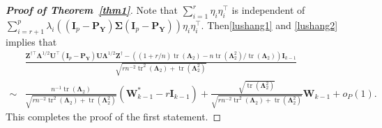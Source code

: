 \documentclass[10pt]{book}
\theoremstyle{definition}
\DeclareMathOperator{\mytr}{tr}
\newcommand{\bZ}{\mathbf{Z}}
\newcommand{\bP}{\mathbf{P}}
\newcommand{\bY}{\mathbf{Y}}
\newcommand{\bI}{\mathbf{I}}
\newcommand{\bU}{\mathbf{U}}
\newcommand{\bW}{\mathbf{W}}
\newcommand{\bfsym}[1]{\ensuremath{\boldsymbol{#1}}}
\def\bLambda {\bfsym {\Lambda}}
\def\bSigma {\bfsym {\Sigma}}
\begin{document}
\begin{proof}[\textbf{Proof of Theorem~\ref{thm1}}]
Note that $\sum_{i=1}^r \eta_i \eta_i^\top$ is independent of $
\sum_{i=r+1}^p \lambda_i ( (\bI_p-\bP_{\bY})\bSigma (\bI_p-\bP_{\bY}))\eta_i \eta_i^\top
$.
Then\eqref{lushang1} and \eqref{lushang2} implies that
\begin{equation}\label{lushang3}
    \begin{split}
&
\frac{
    \bZ^{\dagger \top} \bLambda^{1/2}\bU^\top (\bI_p-\bP_{\bY})\bU\bLambda^{1/2}\bZ^{\dagger}
    -
    \left((1+r/n)\mytr(\bLambda_2)-n\mytr(\bLambda_2^2)/\mytr(\bLambda_2)\right)\bI_{k-1}
}{
    \sqrt{
        rn^{-2}\mytr^2(\bLambda_2)+ 
        \mytr(\bLambda_2^2)
    }
}
\\
\sim&
\frac{
    n^{-1} \mytr(\bLambda_2)
}{
    \sqrt{
        rn^{-2} \mytr^2 (\bLambda_2) + \mytr(\bLambda_2^2)
    }
}
(\bW_{k-1}^* - r\bI_{k-1})
+
\frac{
    \sqrt{\mytr(\bLambda_2^2)}
}{
    \sqrt{
        rn^{-2} \mytr^2 (\bLambda_2) + \mytr(\bLambda_2^2)
    }
}
\bW_{k-1}
+o_P(1).
    \end{split}
\end{equation}
This completes the proof of the first statement.


\end{proof}
\end{document}

